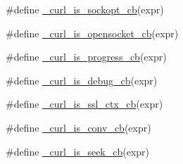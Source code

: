 \begin{DoxyCompactItemize}
\item 
\#define \hyperlink{typecheck-gcc_8h_aee6cc642016be3742e3dd2fee0c7a107}{\+\_\+curl\+\_\+is\+\_\+sockopt\+\_\+cb}(expr)
\item 
\#define \hyperlink{typecheck-gcc_8h_a128331b4b1d5b537099b020fcc383af1}{\+\_\+curl\+\_\+is\+\_\+opensocket\+\_\+cb}(expr)
\item 
\#define \hyperlink{typecheck-gcc_8h_aed3dfc6abebb81de797621133fb4cb5e}{\+\_\+curl\+\_\+is\+\_\+progress\+\_\+cb}(expr)
\item 
\#define \hyperlink{typecheck-gcc_8h_a7bdfeab77393e9925ff74f6c19b838b1}{\+\_\+curl\+\_\+is\+\_\+debug\+\_\+cb}(expr)
\item 
\#define \hyperlink{typecheck-gcc_8h_af3824227ed3542cf9d7879f36de5de9d}{\+\_\+curl\+\_\+is\+\_\+ssl\+\_\+ctx\+\_\+cb}(expr)
\item 
\#define \hyperlink{typecheck-gcc_8h_acae13d0a890cf86e9dd8af64d648e190}{\+\_\+curl\+\_\+is\+\_\+conv\+\_\+cb}(expr)
\item 
\#define \hyperlink{typecheck-gcc_8h_ae7b2e1695c5aa009cab8486e76e7040b}{\+\_\+curl\+\_\+is\+\_\+seek\+\_\+cb}(expr)
\end{DoxyCompactItemize}
